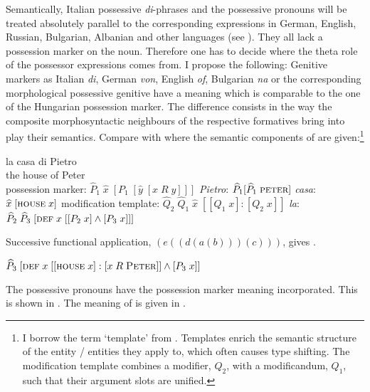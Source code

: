 \documentclass[output=paper,colorlinks,citecolor=brown]{langscibook}
\begin{document}
Semantically, Italian possessive \textit{di}-phrases and the possessive pronouns will be treated absolutely parallel to the corresponding expressions in German, English, Russian, Bulgarian, Albanian and other languages (see \citealt{Zimmermann90Pranominale-Argument}). They all lack a possession marker on the noun. Therefore one has to decide where the theta role of the possessor expressions comes from. I propose the following: Genitive markers as Italian \textit{di}, German \textit{von}, English \textit{of}, Bulgarian \textit{na} or the corresponding morphological possessive genitive have a meaning which is comparable to the one of the Hungarian possession marker. The difference consists in the way the composite morphosyntactic neighbours of the respective formatives bring into play their semantics. Compare  with  where the semantic components of  are given:\footnote{I borrow the term ‘template’ from \citet{Bierwisch89Dimensional-Adjectives}. Templates enrich the semantic structure of the entity / entities they apply to, which often causes type shifting. The modification template combines a modifier, $Q_{2}$, with a modificandum, $Q_{1}$, such that their argument slots are unified.}

\ea \label{ex:zi91:29}
    \gll la casa di Pietro \\
    the house of Peter \\
    \glt
\ex \label{ex:zi91:30}
    \ea \label{ex:zi91:30a} possession marker: ${\widehat{P}}_{1} \; \widehat{x} \; [{P}_{1} \; [\widehat{y} \; [x \; R \; y]]]$
    \ex \label{ex:zi91:30b} \textit{Pietro}: ${\widehat{P}}_{1} [\widehat{P}_{1} \; \textsc{peter}]$
    \ex \label{ex:zi91:30c} \textit{casa}: $\widehat{x} \; [\textsc{house} \; x]$
    \ex \label{ex:zi91:30d} modification template: $\widehat{Q}_{2} \; \widehat{Q}_{1} \; \widehat{x} \; [[{Q}_{1} \; x]:[{Q}_{2} \; x]]$
    \ex \label{ex:zi91:30e} \textit{la}: $\widehat{P}_{2} \; \widehat{P}_{3} \; [\textsc{def} \; x \; [[P_{2} \;x]\wedge[P_{3} \;x]]]$
    \z
\z

\noindent Successive functional application, $(e((d(a (b))) (c)))$, gives .

\ea \label{ex:zi91:31} $\widehat{P}_{3} \; [\textsc{def} \; x \; [[\textsc{house} \;x]:[x \; R \; \textsc{Peter}]]\wedge[P_{3} \; x]]$
\z 

\noindent The possessive pronouns have the possession marker meaning incorporated. This is shown in . The meaning of  is given in .
\end{document}
